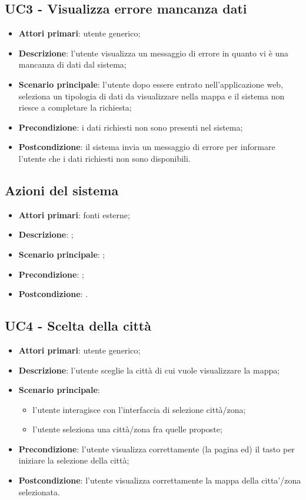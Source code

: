 \subsection{UC3 - Visualizza errore mancanza dati}
\begin{itemize}
	\item \textbf{Attori primari}: utente generico;
	\item \textbf{Descrizione}: l'utente visualizza un messaggio di errore in quanto vi è una mancanza di dati dal sistema;
	\item \textbf{Scenario principale}: l'utente dopo essere entrato nell'applicazione web, seleziona un tipologia di dati da visualizzare nella mappa e il sistema non riesce a completare la richiesta;
	\item \textbf{Precondizione}: i dati richiesti non sono presenti nel sistema;
	\item \textbf{Postcondizione}: il sistema invia un messaggio di errore per informare l'utente che i dati richiesti non sono disponibili.
\end{itemize}

\subsection{Azioni del sistema}
\begin{itemize}
\item \textbf{Attori primari}: fonti esterne;
\item \textbf{Descrizione}: ;
\item \textbf{Scenario principale}: ;
\item \textbf{Precondizione}: ;
\item \textbf{Postcondizione}: .
\end{itemize}

\subsection{UC4 - Scelta della città}
\begin{itemize}
\item \textbf{Attori primari}: utente generico;
\item \textbf{Descrizione}: l’utente sceglie la città di cui vuole visualizzare la mappa;
\item \textbf{Scenario principale}:
	\begin{itemize}
		\item l’utente interagisce con l’interfaccia di selezione città/zona;
		\item l’utente seleziona una città/zona fra quelle proposte;
	\end{itemize}
\item \textbf{Precondizione}: l’utente visualizza correttamente (la pagina ed) il tasto per iniziare la selezione della città;
\item \textbf{Postcondizione}:  l’utente visualizza correttamente la mappa della citta’/zona selezionata.
\end{itemize}

